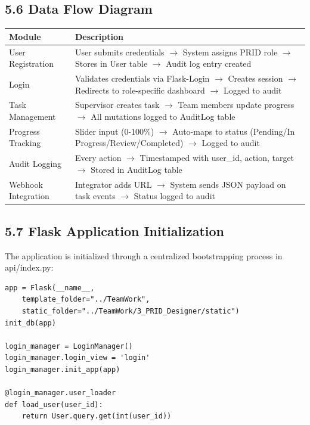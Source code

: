 ﻿\documentclass[12pt]{article}
\begin{document}
\subsection*{5.6 Data Flow Diagram}
\begin{center}
\begin{tabular}{|l|p{10cm}|}
\hline
\textbf{Module} & \textbf{Description} \\ \hline
User Registration & User submits credentials $\rightarrow$ System assigns PRID role $\rightarrow$ Stores in User table $\rightarrow$ Audit log entry created \\ \hline
Login & Validates credentials via Flask-Login $\rightarrow$ Creates session $\rightarrow$ Redirects to role-specific dashboard $\rightarrow$ Logged to audit \\ \hline
Task Management & Supervisor creates task $\rightarrow$ Team members update progress $\rightarrow$ All mutations logged to AuditLog table \\ \hline
Progress Tracking & Slider input (0-100\%) $\rightarrow$ Auto-maps to status (Pending/In Progress/Review/Completed) $\rightarrow$ Logged to audit \\ \hline
Audit Logging & Every action $\rightarrow$ Timestamped with user\_id, action, target $\rightarrow$ Stored in AuditLog table \\ \hline
Webhook Integration & Integrator adds URL $\rightarrow$ System sends JSON payload on task events $\rightarrow$ Status logged to audit \\ \hline
\end{tabular}
\end{center}

\subsection*{5.7 Flask Application Initialization}
The application is initialized through a centralized bootstrapping process in api/index.py:

\begin{lstlisting}[style=pycode]
app = Flask(__name__,
    template_folder="../TeamWork",
    static_folder="../TeamWork/3_PRID_Designer/static")
init_db(app)

login_manager = LoginManager()
login_manager.login_view = 'login'
login_manager.init_app(app)

@login_manager.user_loader
def load_user(user_id):
    return User.query.get(int(user_id))
\end{lstlisting}
\end{document}
